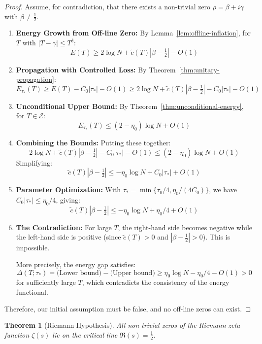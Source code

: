 \documentclass[11pt,hyp,]{nyjm}
\newtheorem{theorem}{Theorem}
\begin{document}
\begin{proof}
Assume, for contradiction, that there exists a non-trivial zero $\rho = \beta + i\gamma$ with $\beta \neq \tfrac12$.

\begin{enumerate}
\item \textbf{Energy Growth from Off-line Zero:} By Lemma~\ref{lem:offline-inflation}, for $T$ with $|T - \gamma| \leq T^\delta$:
\[
E(T) \geq 2\log N + \tilde{c}(T)|\beta - \tfrac12| - O(1)
\]

\item \textbf{Propagation with Controlled Loss:} By Theorem~\ref{thm:unitary-propagation}:
\[
E_{\tau_*}(T) \geq E(T) - C_0|\tau_*| - O(1) \geq 2\log N + \tilde{c}(T)|\beta - \tfrac12| - C_0|\tau_*| - O(1)
\]

\item \textbf{Unconditional Upper Bound:} By Theorem~\ref{thm:unconditional-energy}, for $T \in \mathcal{E}$:
\[
E_{\tau_*}(T) \leq (2 - \eta_0)\log N + O(1)
\]

\item \textbf{Combining the Bounds:} Putting these together:
\[
2\log N + \tilde{c}(T)|\beta - \tfrac12| - C_0|\tau_*| - O(1) \leq (2 - \eta_0)\log N + O(1)
\]
Simplifying:
\[
\tilde{c}(T)|\beta - \tfrac12| \leq -\eta_0\log N + C_0|\tau_*| + O(1)
\]

\item \textbf{Parameter Optimization:} With $\tau_* = \min\{\tau_0/4, \eta_0/(4C_0)\}$, we have $C_0|\tau_*| \leq \eta_0/4$, giving:
\[
\tilde{c}(T)|\beta - \tfrac12| \leq -\eta_0\log N + \eta_0/4 + O(1)
\]

\item \textbf{The Contradiction:} For large $T$, the right-hand side becomes negative while the left-hand side is positive (since $\tilde{c}(T) > 0$ and $|\beta - \tfrac12| > 0$). This is impossible.

More precisely, the energy gap satisfies:
\[
\Delta(T;\tau_*) = \text{(Lower bound)} - \text{(Upper bound)} \geq \eta_0\log N - \eta_0/4 - O(1) > 0
\]
for sufficiently large $T$, which contradicts the consistency of the energy functional.
\end{enumerate}

Therefore, our initial assumption must be false, and no off-line zeros can exist.
\end{proof}

\begin{theorem}[Riemann Hypothesis]\label{thm:riemann-hypothesis}
All non-trivial zeros of the Riemann zeta function $\zeta(s)$ lie on the critical line $\Re(s) = \tfrac12$.
\end{theorem}
\end{document}
